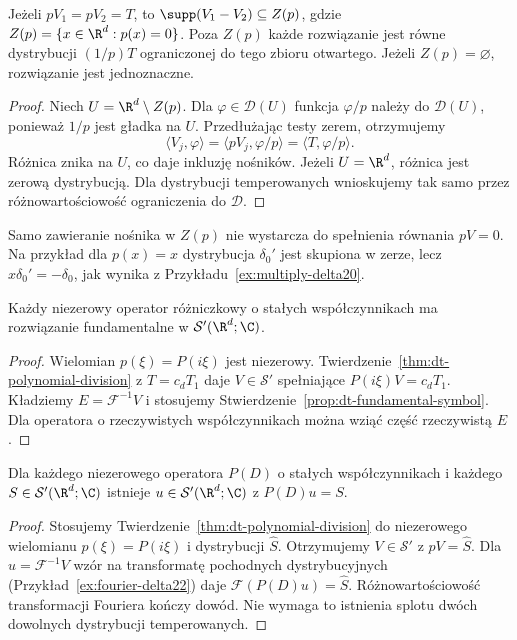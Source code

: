 \begin{wniosek}
\label{cor:dt-division-support}
Jeżeli $pV_1=pV_2=T$, to
$\supp(V_1-V_2)\subseteq Z(p)$, gdzie
$Z(p)=\{x\in\R^d:p(x)=0\}$.
Poza $Z(p)$ każde rozwiązanie jest równe
dystrybucji $(1/p)T$ ograniczonej do tego zbioru
otwartego. Jeżeli $Z(p)=\varnothing$, rozwiązanie
jest jednoznaczne.
\end{wniosek}
\begin{proof}
Niech $U=\R^d\setminus Z(p)$. Dla
$\varphi\in\mathcal D(U)$ funkcja $\varphi/p$
należy do $\mathcal D(U)$, ponieważ $1/p$
jest gładka na $U$. Przedłużając testy zerem,
otrzymujemy
\[
 \langle V_j,\varphi\rangle
 =\langle pV_j,\varphi/p\rangle
 =\langle T,\varphi/p\rangle.
\]
Różnica znika na $U$, co daje inkluzję nośników.
Jeżeli $U=\R^d$, różnica jest zerową dystrybucją.
Dla dystrybucji temperowanych wnioskujemy tak samo
przez różnowartościowość ograniczenia do $\mathcal D$.
\end{proof}

\begin{uwaga}
Samo zawieranie nośnika w $Z(p)$ nie wystarcza
do spełnienia równania $pV=0$. Na przykład dla
$p(x)=x$ dystrybucja $\delta_0'$ jest skupiona
w zerze, lecz $x\delta_0'=-\delta_0$, jak wynika
z Przykładu~\ref{ex:multiply-delta20}.
\end{uwaga}

\begin{wniosek}
\label{cor:dt-tempered-fundamental}
Każdy niezerowy operator różniczkowy o stałych
współczynnikach ma rozwiązanie fundamentalne
w $\mathcal S'(\R^d;\C)$.
\end{wniosek}
\begin{proof}
Wielomian $p(\xi)=P(i\xi)$ jest niezerowy.
Twierdzenie~\ref{thm:dt-polynomial-division}
z $T=c_d T_1$ daje $V\in\mathcal S'$ spełniające
$P(i\xi)V=c_d T_1$.
Kładziemy $E=\mathcal F^{-1}V$ i stosujemy
Stwierdzenie~\ref{prop:dt-fundamental-symbol}.
Dla operatora o rzeczywistych współczynnikach
można wziąć część rzeczywistą $E$.
\end{proof}

\begin{wniosek}
\label{cor:dt-constant-coefficient-surjectivity}
Dla każdego niezerowego operatora $P(D)$ o stałych
współczynnikach i każdego $S\in\mathcal S'(\R^d;\C)$
istnieje $u\in\mathcal S'(\R^d;\C)$ z $P(D)u=S$.
\end{wniosek}
\begin{proof}
Stosujemy Twierdzenie~\ref{thm:dt-polynomial-division}
do niezerowego wielomianu $p(\xi)=P(i\xi)$
i dystrybucji $\widehat S$. Otrzymujemy
$V\in\mathcal S'$ z $pV=\widehat S$.
Dla $u=\mathcal F^{-1}V$ wzór na transformatę
pochodnych dystrybucyjnych
(Przykład~\ref{ex:fourier-delta22}) daje
$\mathcal F(P(D)u)=\widehat S$. Różnowartościowość
transformacji Fouriera kończy dowód.
Nie wymaga to istnienia splotu dwóch dowolnych
dystrybucji temperowanych.
\end{proof}

